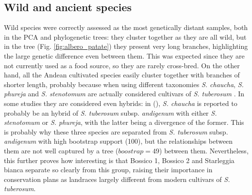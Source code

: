 \documentclass[a4paper, 12pt]{report}
\begin{document}
\subsection{Wild and ancient species}
Wild species were correctly assessed as the most genetically distant samples, both in the PCA and phylogenetic trees: they cluster together as they are all wild, but in the tree (Fig. \ref{fig:albero_patate}) they present very long branches, highlighting the large genetic difference even between them. This was expected since they are not currently used as a food source, so they are rarely cross-bred. On the other hand, all the Andean cultivated species easily cluster together with branches of shorter length, probably because when using different taxonomies \textit{S. chaucha}, \textit{S. phureja} and \textit{S. stenotomum} are actually considered cultivars of \textit{S. tuberosum} \parencite{machida-hiranoDiversityPotatoGenetic2015}. In some studies they are considered even hybrids: in \citeauthor{huamanReclassificationLandracePopulations2002} (\citeyear{huamanReclassificationLandracePopulations2002}), \textit{S. chaucha} is reported to probably be an hybrid of \textit{S. tuberosum} subsp. \textit{andigenum} with either \textit{S. stenotomum} or \textit{S. phureja}, with the latter being a divergence of the former. This is probably why these three species are separated from \textit{S. tuberosum} subsp. \textit{andigenum} with high bootstrap support (100), but the relationships between them are not well captured by a tree ($boostrap = 49$) between them. Nevertheless, this further proves how interesting is that Bossico 1, Bossico 2 and Starleggia bianca separate so clearly from this group, raising their importance in conservation plans as landraces largely different from modern cultivars of \textit{S. tuberosum}.
\end{document}
